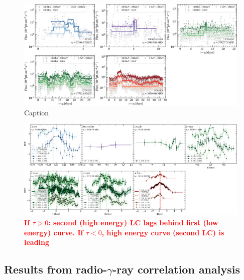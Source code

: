 \documentclass[twocolumn]{aastex62}
\newcommand{\gray}{$\gamma$-ray\xspace}
\newcommand{\todo}[1]{\textbf{\textcolor{red}{#1}}}
\begin{document}
\begin{figure}
    \centering
    \includegraphics[width = .9 \linewidth]{figures/lc_ebins_ts9.pdf}
    \caption{Caption}
    \label{fig:lcebins}
\end{figure}

\begin{figure}
    \centering
    \includegraphics[width = .9 \linewidth]{figures/zdcf_ebins.pdf}
    \caption{\todo{If $\tau > 0$: second (high energy) LC lags behind first (low energy) curve. If $\tau < 0$, high energy curve (second LC) is leading}}
    \label{fig:zdcf}
\end{figure}



\subsection{Results from radio-\gray correlation analysis}
\label{sec:gammaradio}
\end{document}
